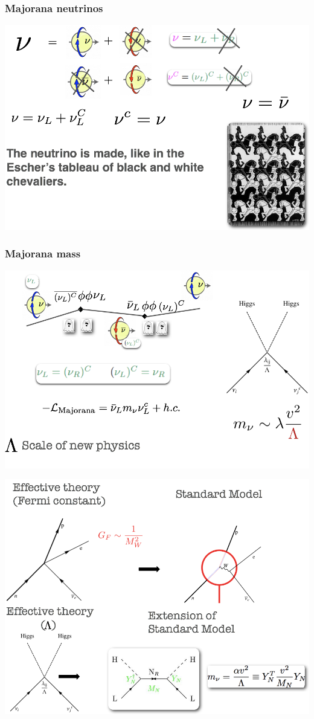 \begin{frame}
\frametitle{Majorana neutrinos}
\includegraphics[scale=0.30]{img/MajoranaNeutrinosCartoon.png}
\end{frame}

\begin{frame}
\frametitle{Majorana mass}
\includegraphics[scale=0.30]{img/MajoranaMass.png}
\end{frame}

\begin{frame}
\includegraphics[scale=0.30]{img/Effective.png}
\end{frame}

